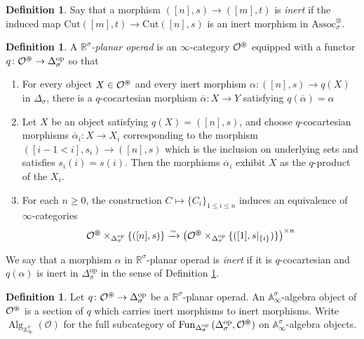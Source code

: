 \documentclass{article}
\DeclareMathOperator{\Alg}{Alg}
\DeclareMathOperator{\Fun}{Fun} %
\newcommand{\RR}{\mathbb{R}}
\renewcommand{\AA}{\mathbb{A}}
\newcommand{\op}{\mathrm{op}}
\newcommand{\Associnv}{\mathrm{Assoc}_\sigma}
\theoremstyle{definition}
\newtheorem{definition}[equation]{Definition}
\begin{document}
\begin{definition}\label{defn:inert_map_in_involutive_simplicial_cat}
    Say that a morphism $ ([n], s) \to ([m], t) $ is \emph{inert} if the induced map $ \mathrm{Cut}([m],t) \to \mathrm{Cut}([n],s) $ is an inert morphism in $ \Associnv^\otimes $. 
\end{definition}
\begin{definition}
    A \emph{$ \RR^\sigma $-planar operad} is an $ \infty $-category $ \mathcal{O}^\varoast $ equipped with a functor $ q \colon \mathcal{O}^\varoast \to \Delta^\op_\sigma $ so that 
    \begin{enumerate}
        \item For every object $ X \in \mathcal{O}^\varoast $ and every inert morphism $ \alpha\colon ([n],s) \to q(X) $ in $ \Delta_\sigma $, there is a $ q $-cocartesian morphism $ \overline{\alpha} \colon X \to Y $ satisfying $ q (\overline{\alpha}) = \alpha $
        \item Let $ X $ be an object satisfying $ q (X) = ([n],s) $, and choose $ q $-cocartesian morphisms $ \overline{\alpha}_i \colon X \to X_i $ corresponding to the morphism $ ([i-1< i], s_i) \to ([n], s) $ which is the inclusion on underlying sets and satisfies $ s_i(i) = s(i) $. 
        Then the morphisms $ \overline{\alpha}_i $ exhibit $ X $ as the $ q $-product of the $ X_i $. 
        \item For each $ n \geq 0 $, the construction $ C \mapsto \{C_i \}_{1 \leq i \leq n} $ induces an equivalence of $ \infty $-categories 
        \begin{equation*}
            \mathcal{O}^\varoast \times_{\Delta^\op_\sigma} \{([n], s)\} \xrightarrow{\sim} \left(\mathcal{O}^\varoast \times_{\Delta^\op_\sigma} \{([1], s|_{\{i\}})\}\right)^{\times n}
        \end{equation*}
    \end{enumerate}
    We say that a morphism $ \alpha $ in $ \RR^\sigma $-planar operad is \emph{inert} if it is $ q $-cocartesian and $ q (\alpha) $ is inert in $ \Delta^\op_\sigma $ in the sense of Definition \ref{defn:inert_map_in_involutive_simplicial_cat}. 
\end{definition}
\begin{definition}\label{defn:inv_planar_alg}
    Let $ q \colon \mathcal{O}^\varoast \to \Delta^\op_\sigma $ be a $ \RR^\sigma $-planar operad. 
    An $ \AA^\sigma_\infty $-algebra object of $ \mathcal{O}^{\varoast} $ is a section of $ q $ which carries inert morphisms to inert morphisms. 
    Write $ \Alg_{\AA^\sigma_\infty}(\mathcal{O}) $ for the full subcategory of $ \Fun_{\Delta^\op_{\sigma}}\left(\Delta^\op_\sigma, \mathcal{O}^\varoast\right) $ on $ \AA^\sigma_\infty $-algebra objects.  
\end{definition}
\end{document}
